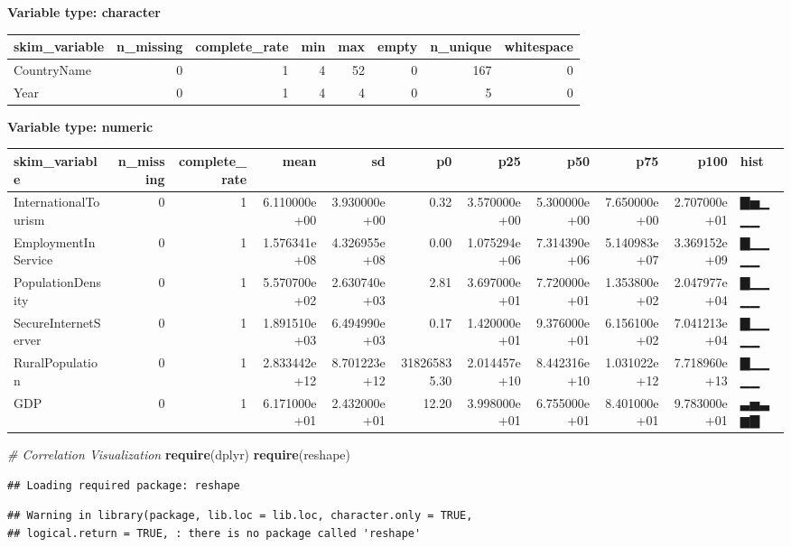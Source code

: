 \documentclass[ignorenonframetext,]{beamer}
\newenvironment{Shaded}{\begin{snugshade}}{\end{snugshade}}
\newcommand{\CommentTok}[1]{\textcolor[rgb]{0.56,0.35,0.01}{\textit{#1}}}
\newcommand{\KeywordTok}[1]{\textcolor[rgb]{0.13,0.29,0.53}{\textbf{#1}}}
\newcommand{\NormalTok}[1]{#1}
\begin{document}
\begin{frame}[fragile]
\textbf{Variable type: character}

\begin{longtable}[]{@{}lrrrrrrr@{}}
\toprule
skim\_variable & n\_missing & complete\_rate & min & max & empty &
n\_unique & whitespace\tabularnewline
\midrule
\endhead
CountryName & 0 & 1 & 4 & 52 & 0 & 167 & 0\tabularnewline
Year & 0 & 1 & 4 & 4 & 0 & 5 & 0\tabularnewline
\bottomrule
\end{longtable}

\textbf{Variable type: numeric}

\begin{longtable}[]{@{}lrrrrrrrrrl@{}}
\toprule
skim\_variable & n\_missing & complete\_rate & mean & sd & p0 & p25 &
p50 & p75 & p100 & hist\tabularnewline
\midrule
\endhead
InternationalTourism & 0 & 1 & 6.110000e+00 & 3.930000e+00 & 0.32 &
3.570000e+00 & 5.300000e+00 & 7.650000e+00 & 2.707000e+01 &
▇▅▁▁▁\tabularnewline
EmploymentInService & 0 & 1 & 1.576341e+08 & 4.326955e+08 & 0.00 &
1.075294e+06 & 7.314390e+06 & 5.140983e+07 & 3.369152e+09 &
▇▁▁▁▁\tabularnewline
PopulationDensity & 0 & 1 & 5.570700e+02 & 2.630740e+03 & 2.81 &
3.697000e+01 & 7.720000e+01 & 1.353800e+02 & 2.047977e+04 &
▇▁▁▁▁\tabularnewline
SecureInternetServer & 0 & 1 & 1.891510e+03 & 6.494990e+03 & 0.17 &
1.420000e+01 & 9.376000e+01 & 6.156100e+02 & 7.041213e+04 &
▇▁▁▁▁\tabularnewline
RuralPopulation & 0 & 1 & 2.833442e+12 & 8.701223e+12 & 318265835.30 &
2.014457e+10 & 8.442316e+10 & 1.031022e+12 & 7.718960e+13 &
▇▁▁▁▁\tabularnewline
GDP & 0 & 1 & 6.171000e+01 & 2.432000e+01 & 12.20 & 3.998000e+01 &
6.755000e+01 & 8.401000e+01 & 9.783000e+01 & ▃▅▃▆▇\tabularnewline
\bottomrule
\end{longtable}

\begin{Shaded}
\begin{Highlighting}[]
\CommentTok{# Correlation Visualization}
\KeywordTok{require}\NormalTok{(dplyr)}
\KeywordTok{require}\NormalTok{(reshape)}
\end{Highlighting}
\end{Shaded}

\begin{verbatim}
## Loading required package: reshape
\end{verbatim}

\begin{verbatim}
## Warning in library(package, lib.loc = lib.loc, character.only = TRUE,
## logical.return = TRUE, : there is no package called 'reshape'
\end{verbatim}


\end{frame}
\end{document}
